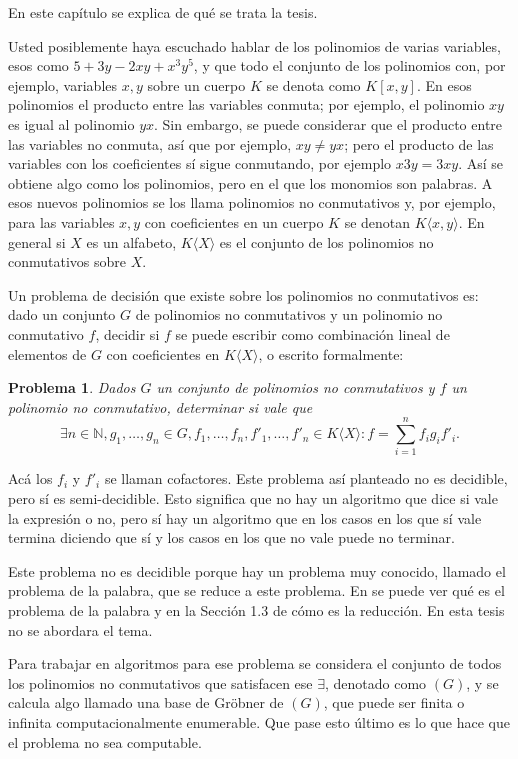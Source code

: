 \documentclass[12pt]{report}
\theoremstyle{customstyle}
\newtheorem{problem}{Problema}
\theoremstyle{factstyle}
\begin{document}
En este capítulo se explica de qué se trata la tesis.

Usted posiblemente haya escuchado hablar de los polinomios de varias variables, esos como $5 + 3 y - 2 x y + x^3 y^5$, y que todo el conjunto de los polinomios con, por ejemplo, variables $x, y$ sobre un cuerpo $K$ se denota como $K[x, y]$. En esos polinomios el producto entre las variables conmuta; por ejemplo, el polinomio $x y$ es igual al polinomio $y x$. Sin embargo, se puede considerar que el producto entre las variables no conmuta, así que por ejemplo, $x y ≠ y x$; pero el producto de las variables con los coeficientes sí sigue conmutando, por ejemplo $x 3 y = 3 x y$. Así se obtiene algo como los polinomios, pero en el que los monomios son palabras. A esos nuevos polinomios se los llama polinomios no conmutativos y, por ejemplo, para las variables $x, y$ con coeficientes en un cuerpo $K$ se denotan $K⟨x, y⟩$. En general si $X$ es un alfabeto, $K⟨X⟩$ es el conjunto de los polinomios no conmutativos sobre $X$.

Un problema de decisión que existe sobre los polinomios no conmutativos es: dado un conjunto $G$ de polinomios no conmutativos y un polinomio no conmutativo $f$, decidir si $f$ se puede escribir como combinación lineal de elementos de $G$ con coeficientes en $K⟨X⟩$, o escrito formalmente:

\begin{problem}\label{problem:principal}
  Dados $G$ un conjunto de polinomios no conmutativos y $f$ un polinomio no conmutativo, determinar si vale que
  \[ ∃n ∈ ℕ, g_1, …, g_n ∈ G, f_1, …, f_n, f'_1, …, f'_n ∈ K⟨X⟩ : f = ∑_{i = 1}^n f_i g_i f'_i \text{.}\]
\end{problem}

Acá los $f_i$ y $f'_i$ se llaman cofactores. Este problema así planteado no es decidible, pero sí es semi-decidible. Esto significa que no hay un algoritmo que dice si vale la expresión o no, pero sí hay un algoritmo que en los casos en los que sí vale termina diciendo que sí y los casos en los que no vale puede no terminar.

Este problema no es decidible porque hay un problema muy conocido, llamado el problema de la palabra, que se reduce a este problema. En \cite{web:wiki:WordPproblem} se puede ver qué es el problema de la palabra y en la Sección 1.3 de \cite{article:MORA1994131} cómo es la reducción. En esta tesis no se abordara el tema.

Para trabajar en algoritmos para ese problema se considera el conjunto de todos los polinomios no conmutativos que satisfacen ese $∃$, denotado como $(G)$, y se calcula algo llamado una base de Gröbner de $(G)$, que puede ser finita o infinita computacionalmente enumerable. Que pase esto último es lo que hace que el problema no sea computable. %
\end{document}

